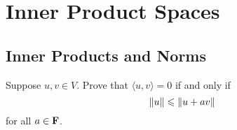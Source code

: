 \chapter{Inner Product Spaces}

\section{Inner Products and Norms}

\begin{exercise}{6}
	Suppose $u, v \in V$. Prove that $\langle u, v\rangle = 0$ if and only if
	\[
		\norm{u} \leqslant \norm{u + av}
	\]
	for all $a \in \mathbf{F}$.
\end{exercise}
